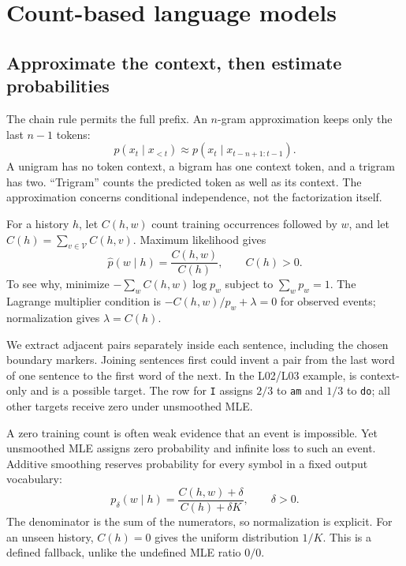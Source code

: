 \clearpage
\section{Count-based language models}\label{sec:counts}
\subsection*{Approximate the context, then estimate probabilities}
The chain rule permits the full prefix. An $n$-gram approximation keeps
only the last $n-1$ tokens:
\[
 p(x_t\mid x_{<t})\approx p(x_t\mid x_{t-n+1:t-1}).
\]
A unigram has no token context, a bigram has one context token, and a
trigram has two. ``Trigram'' counts the predicted token as well as its context.
The approximation concerns conditional independence, not the factorization itself.


For a history $h$, let $C(h,w)$ count training occurrences followed by $w$,
and let $C(h)=\sum_{v\in\mathcal V}C(h,v)$. Maximum likelihood gives
\[
 \widehat p(w\mid h)=\frac{C(h,w)}{C(h)},\qquad C(h)>0.
\]
To see why, minimize $-\sum_w C(h,w)\log p_w$ subject to $\sum_wp_w=1$.
The Lagrange multiplier condition is $-C(h,w)/p_w+\lambda=0$ for observed
events; normalization gives $\lambda=C(h)$.


We extract adjacent pairs separately inside each sentence, including the
chosen boundary markers. Joining sentences first could invent a pair from
the last word of one sentence to the first word of the next. In the
L02/L03 example, \BOS{} is context-only and \EOS{} is a possible target.
The row for \texttt{I} assigns $2/3$ to \texttt{am} and $1/3$ to
\texttt{do}; all other targets receive zero under unsmoothed MLE.


A zero training count is often weak evidence that an event is impossible.
Yet unsmoothed MLE assigns zero probability and infinite loss to such an
event. Additive smoothing reserves probability for every symbol in a
fixed output vocabulary:
\[
 p_\delta(w\mid h)=\frac{C(h,w)+\delta}{C(h)+\delta K},\qquad\delta>0.
\]
The denominator is the sum of the numerators, so normalization is explicit.
For an unseen history, $C(h)=0$ gives the uniform distribution $1/K$.
This is a defined fallback, unlike the undefined MLE ratio $0/0$.

